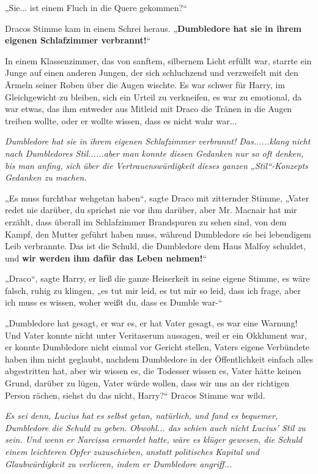 {„Sie... ist einem Fluch in die Quere gekommen?“

Dracos Stimme kam in einem Schrei heraus. „\textbf{Dumbledore hat sie in ihrem eigenen Schlafzimmer verbrannt!}“

In einem Klassenzimmer, das von sanftem, silbernem Licht erfüllt war, starrte ein Junge auf einen anderen Jungen, der sich schluchzend und verzweifelt mit den Ärmeln seiner Roben über die Augen wischte. Es war schwer für Harry, im Gleichgewicht zu bleiben, sich ein Urteil zu verkneifen, es war zu emotional, da war etwas, das ihm entweder aus Mitleid mit Draco die Tränen in die Augen treiben wollte, oder er wollte wissen, dass es nicht wahr war...

\emph{Dumbledore hat sie in ihrem eigenen Schlafzimmer verbrannt! Das......klang nicht nach Dumbledores Stil......aber man konnte diesen Gedanken nur so oft denken, bis man anfing, sich über die Vertrauenswürdigkeit dieses ganzen „Stil“-Konzepts Gedanken zu machen.}

„Es muss furchtbar wehgetan haben“, sagte Draco mit zitternder Stimme, „Vater redet nie darüber, du sprichst nie vor ihm darüber, aber Mr. Macnair hat mir erzählt, dass überall im Schlafzimmer Brandspuren zu sehen sind, von dem Kampf, den Mutter geführt haben muss, während Dumbledore sie bei lebendigem Leib verbrannte. Das ist die Schuld, die Dumbledore dem Haus Malfoy schuldet, und \textbf{wir werden ihm dafür das Leben nehmen!}“

„Draco“, sagte Harry, er ließ die ganze Heiserkeit in seine eigene Stimme, es wäre falsch, ruhig zu klingen, „es tut mir leid, es tut mir so leid, dass ich frage, aber ich muss es wissen, woher weißt du, dass es Dumble war-“

„Dumbledore hat gesagt, er war es, er hat Vater gesagt, es war eine Warnung! Und Vater konnte nicht unter Veritaserum aussagen, weil er ein Okklument war, er konnte Dumbledore nicht einmal vor Gericht stellen, Vaters eigene Verbündete haben ihm nicht geglaubt, nachdem Dumbledore in der Öffentlichkeit einfach alles abgestritten hat, aber wir wissen es, die Todesser wissen es, Vater hätte keinen Grund, darüber zu lügen, Vater würde wollen, dass wir uns an der richtigen Person rächen, siehst du das nicht, Harry?“ Dracos Stimme war wild.

\emph{Es sei denn, Lucius hat es selbst getan, natürlich, und fand es bequemer, Dumbledore die Schuld zu geben. Obwohl... das schien auch nicht Lucius' Stil zu sein. Und wenn er Narcissa ermordet hatte, wäre es klüger gewesen, die Schuld einem leichteren Opfer zuzuschieben, anstatt politisches Kapital und Glaubwürdigkeit zu verlieren, indem er Dumbledore angriff...}

}
